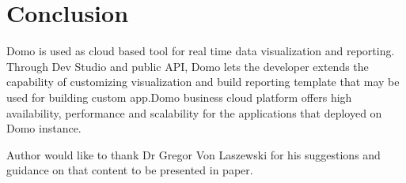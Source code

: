 \section{Conclusion}
Domo is used as cloud based tool for real time data visualization and 
reporting. Through Dev Studio and public API, Domo lets the developer
extends the capability of customizing visualization and build reporting
template that may be used for building custom app.Domo business cloud
platform offers high availability, performance and scalability for the
applications that deployed on Domo instance.


\begin{acks}

Author would like to thank Dr Gregor Von Laszewski 
for his suggestions and guidance on that content to be presented
in paper.
\end{acks}


 

